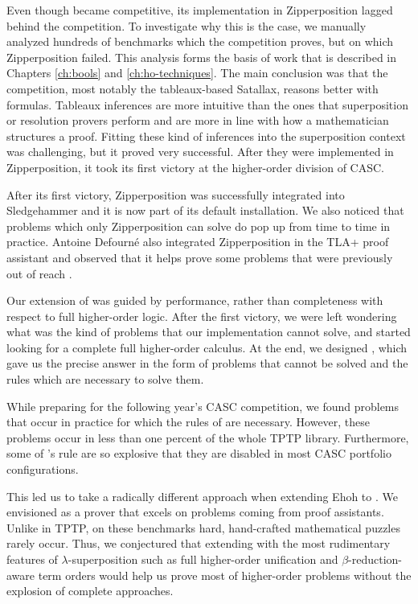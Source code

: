 Even though \lsup{} became competitive, its implementation in Zipperposition
lagged behind the competition. To investigate why this is the case,
we manually analyzed hundreds of benchmarks which the competition proves, but
on which Zipperposition failed. This analysis forms the basis of work that is
described in Chapters \ref{ch:bools} and \ref{ch:ho-techniques}. The main
conclusion was that the competition, most notably the tableaux-based Satallax,
reasons better with formulas. Tableaux inferences are more intuitive than the
ones that superposition or resolution provers perform and are more in line with
how a mathematician structures a proof. Fitting these kind of
inferences into the superposition context was challenging, but it proved very
successful. After they were implemented in Zipperposition, it took its first
victory at the higher-order division of CASC.

After its first victory, Zipperposition was successfully integrated into
Sledgehammer and it is now part of its default installation. We also noticed
that problems which only Zipperposition can solve do pop up from time to time in
practice. Antoine Defourné also integrated Zipperposition in the TLA+ proof
assistant and observed that it helps prove some problems that were previously
out of reach \cite{ad-21-ho-tlaplus}.

Our extension of \lsup{} was guided by performance, rather than completeness
with respect to full higher-order logic. After the first victory, we were left
wondering what was the kind of problems that our implementation cannot
solve, and started looking for a complete full higher-order calculus. At the end,
we designed \osup{}, which gave us the precise answer in the form of problems that
cannot be solved and the rules which are necessary to solve them. 

While preparing for the following year's CASC competition, we found problems
that occur in practice for which the rules of \osup{} are necessary. However,
these problems occur in less than one percent of the whole TPTP library.
Furthermore, some of \osup{}'s rule are so explosive that they are disabled in
most CASC portfolio configurations.

This led us to take a radically different approach when extending Ehoh to
\ehohii{}. We envisioned \ehohii{} as a prover that excels on problems coming
from proof assistants. Unlike in TPTP, on these benchmarks hard, hand-crafted mathematical puzzles rarely occur.
Thus, we conjectured that extending \lfsup{} with the most rudimentary features
of $\lambda$-superposition such as full higher-order unification and
$\beta$-reduction-aware term orders would help us prove most of higher-order
problems without the explosion of complete approaches.

